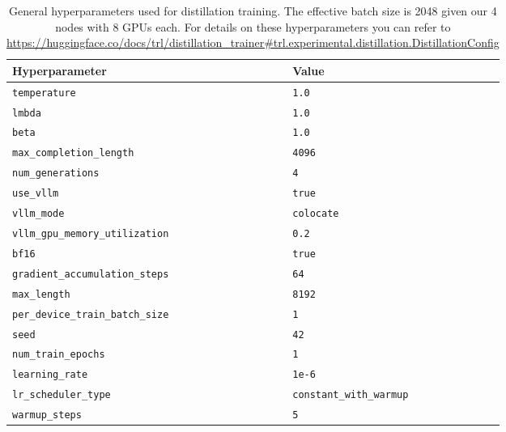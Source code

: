 \begin{table}[H]
    \centering
    \small
    \begin{tabular}{ll}
        \toprule
        Hyperparameter & Value \\
        \midrule
        \texttt{temperature} & \texttt{1.0} \\
        \texttt{lmbda} & \texttt{1.0} \\
        \texttt{beta} & \texttt{1.0} \\
        \texttt{max\_completion\_length} & \texttt{4096} \\
        \texttt{num\_generations} & \texttt{4} \\
        \texttt{use\_vllm} & \texttt{true} \\
        \texttt{vllm\_mode} & \texttt{colocate} \\
        \texttt{vllm\_gpu\_memory\_utilization} & \texttt{0.2} \\
        \texttt{bf16} & \texttt{true} \\
        \texttt{gradient\_accumulation\_steps} & \texttt{64} \\
        \texttt{max\_length} & \texttt{8192} \\
        \texttt{per\_device\_train\_batch\_size} & \texttt{1} \\
        \texttt{seed} & \texttt{42} \\
        \texttt{num\_train\_epochs} & \texttt{1} \\
        \texttt{learning\_rate} & \texttt{1e-6} \\
        \texttt{lr\_scheduler\_type} & \texttt{constant\_with\_warmup} \\
        \texttt{warmup\_steps} & \texttt{5} \\
        \bottomrule
    \end{tabular}
    \caption{General hyperparameters used for distillation training. The effective batch size is 2048 given our 4 nodes with 8 GPUs each. For details on these hyperparameters you can refer to \protect\url{https://huggingface.co/docs/trl/distillation_trainer\#trl.experimental.distillation.DistillationConfig}}
    \label{tab:distillation_hyperparameters}
\end{table}

